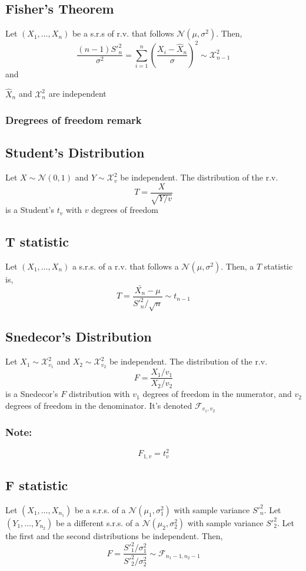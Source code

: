 \subsection{Fisher's Theorem}
Let $(X_1,\dots,X_n)$ be a s.r.s of r.v. that follows $\mathcal{N}(\mu,\sigma^2)$. Then,
\[ \frac{(n-1)S'^2_n}{\sigma^2} = \sum_{i=1}^{n} (\frac{X_i - \hat{X}_n}{\sigma})^2 \sim \mathcal{X}_{n-1}^2 \]
and
\begin{center}
    $\hat{X}_n$ and $\mathcal{X}_n^2$ are independent
\end{center}

\subsubsection{Dregrees of freedom remark}

\subsection{Student's Distribution}
Let $X \sim \mathcal{N}(0,1)$ and $Y \sim \mathcal{X}_v^2$ be independent. The distribution of the r.v. 
\[ T = \frac{X}{\sqrt{Y/v}} \]
is a Student's $t_v$ with $v$ degrees of freedom

\subsection{T statistic}
Let $(X_1,\dots,X_n)$ a s.r.s. of a r.v. that follows a $\mathcal{N}(\mu,\sigma^2)$. Then, a $T$ statistic is,
\[ T = \frac{\bar{X_n}-\mu}{S'^2_n / \sqrt{n}} \sim t_{n-1}\]

\subsection{Snedecor's Distribution}
Let $X_1 \sim \mathcal{X}_{v_1}^2$ and $X_2 \sim \mathcal{X}_{v_2}^2$ be independent. The distribution of the r.v.
\[ F = \frac{X_1/v_1}{X_2/v_2} \]
is a Snedecor's $F$ distribution with $v_1$ degrees of freedom in the numerator, and $v_2$ degrees of freedom in the denominator. It's denoted $\mathcal{F}_{v_1,v_2}$

\subsubsection{Note:}
\[ F_{1,v} = t^2_v \]

\subsection{F statistic}
Let $(X_1,\dots,X_{n_1})$ be a s.r.s. of a $\mathcal{N}(\mu_1,\sigma^2_1)$ with sample variance $S'^2_n$. Let $(Y_1,\dots,Y_{n_2})$ be a different s.r.s. of a 
$\mathcal{N}(\mu_2,\sigma^2_2)$ with sample variance $S'^2_2$. Let the first and the second distributions be independent. Then,
\[ F = \frac{S'^2_1/\sigma^2_1}{S'^2_2/\sigma^2_2} \sim \mathcal{F}_{n_1-1,n_2-1}\]

